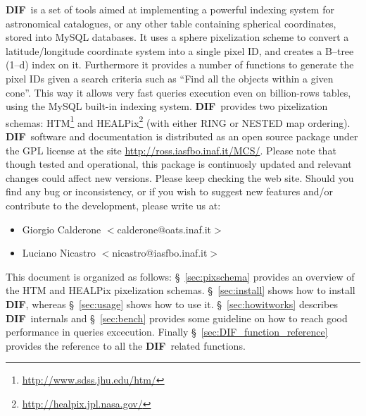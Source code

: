 \documentclass[10pt,titlepage]{article}
\newcommand{\dif}{\textbf{\small DIF}}
\begin{document}
\bigskip

\dif\ is a set of tools aimed at implementing a powerful indexing
system for astronomical catalogues, or any other table containing spherical
coordinates, stored into MySQL databases. It
uses a sphere pixelization scheme to convert a latitude/longitude coordinate
system into a single pixel ID, and creates a B--tree (1--d) index on
it. Furthermore it provides a number of functions to generate the
pixel IDs given a search criteria such as ``Find all the objects within
a given cone''. This way it allows very fast queries
execution even on billion-rows tables, using the MySQL built-in
indexing system. \dif\ provides two pixelization schemas:
HTM\footnote{\url{http://www.sdss.jhu.edu/htm/}} and
HEALPix\footnote{\url{http://healpix.jpl.nasa.gov/}} (with either RING
or NESTED map ordering). \dif\ software and documentation is distributed
as an open source package under the GPL license at the site
\url{http://ross.iasfbo.inaf.it/MCS/}. Please note that though tested
and operational, this package is continuosly updated and relevant
changes could affect new versions. Please keep checking the web
site. Should you find any bug or inconsistency, or if you wish to
suggest new features and/or contribute to the development, please
write us at:

\begin{itemize}
\item Giorgio Calderone $<$calderone@oats.inaf.it$>$
\item Luciano Nicastro $<$nicastro@iasfbo.inaf.it$>$
\end{itemize}
%

\bigskip
This document is organized as follows: \S\ \ref{sec:pixschema}
provides an overview of the HTM and HEALPix pixelization schemas.
\S\ \ref{sec:install} shows how to install \dif, whereas
\S\ \ref{sec:usage} shows how to use it. \S\ \ref{sec:howitworks}
describes \dif\ internals and \S\ \ref{sec:bench} provides some guideline
on how to reach good performance in queries excecution. Finally
\S\ \ref{sec:DIF_function_reference} provides the reference to all the
\dif\ related functions.


%
%
%
%
\end{document}

